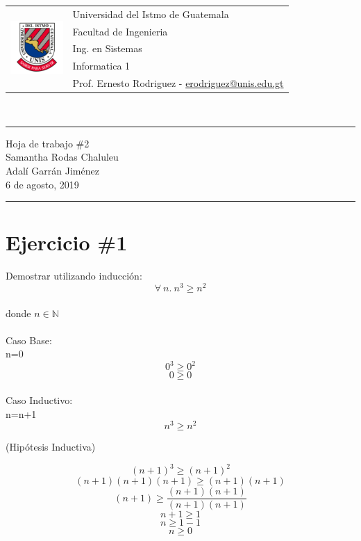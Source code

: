 \documentclass{article}
\newcommand{\horrule}[1]{\rule{\linewidth}{#1}}
\begin{document}
\begin{tabular}{l l}
\multirow{5}{*}{\includegraphics[width=2cm]{escudo.png}} & Universidad del Istmo de Guatemala \\
 & Facultad de Ingenieria \\
 & Ing. en Sistemas \\
 & Informatica 1 \\
 & Prof. Ernesto Rodriguez - \href{mailto:erodriguez@unis.edu.gt}{erodriguez@unis.edu.gt} \\
\end{tabular}
\\

\begin{center}
        \horrule{0.5pt}
        \huge{Hoja de trabajo \#2} \\
        \large{Samantha Rodas Chaluleu}\\
        \large{Adalí Garrán Jiménez}\\
        \large{6 de agosto, 2019} \\
        \horrule{1pt}
\end{center}
\section*{Ejercicio \#1}
Demostrar utilizando inducci\'on:
\[
        \forall\ n.\ n^3\geq n^2
\]
\\donde $n\in\mathbb{N}$\\
\\
\large{Caso Base:}\\
n=0
\[
0^3\geq 0^2
\]
\[
0\geq 0
\]\\
\large{Caso Inductivo:}\\
n=n+1\\
\[
n^3\geq n^2 
\] \begin{center}(Hipótesis Inductiva)\end{center}
\[
(n+1)^3\geq (n+1)^2
\]
\[
(n+1)(n+1)(n+1)\geq (n+1)(n+1)
\]
\[
(n+1)\geq \frac{(n+1)(n+1)}{(n+1)(n+1)}
\]
\[
n+1\geq 1
\]
\[
n\geq 1-1
\]
\[
n\geq 0
\]
\end{document}
